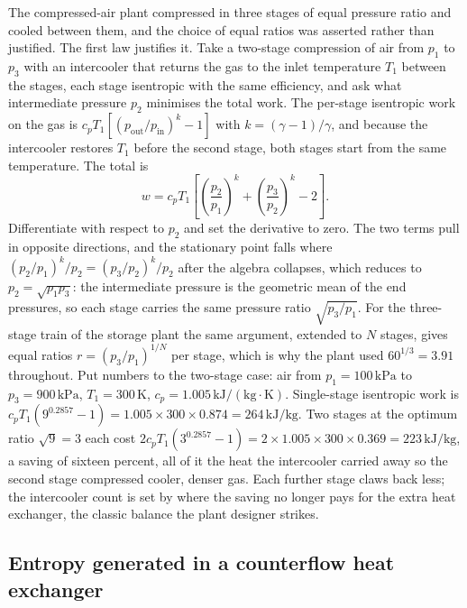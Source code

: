 The compressed-air plant compressed in three stages of equal pressure ratio and
cooled between them, and the choice of equal ratios was asserted rather than
justified. The first law justifies it. Take a two-stage compression of air from
$p_1$ to $p_3$ with an intercooler that returns the gas to the inlet temperature
$T_1$ between the stages, each stage isentropic with the same efficiency, and ask
what intermediate pressure $p_2$ minimises the total work. The per-stage
isentropic work on the gas is $c_p T_1[(p_{\text{out}}/p_{\text{in}})^{k} - 1]$
with $k = (\gamma-1)/\gamma$, and because the intercooler restores $T_1$ before
the second stage, both stages start from the same temperature. The total is
\[
w = c_p T_1\!\left[\left(\frac{p_2}{p_1}\right)^{k} +
\left(\frac{p_3}{p_2}\right)^{k} - 2\right].
\]
Differentiate with respect to $p_2$ and set the derivative to zero. The two
terms pull in opposite directions, and the stationary point falls where
$(p_2/p_1)^{k}/p_2 = (p_3/p_2)^{k}/p_2$ after the algebra collapses, which
reduces to $p_2 = \sqrt{p_1 p_3}$: the intermediate pressure is the geometric
mean of the end pressures, so each stage carries the same pressure ratio
$\sqrt{p_3/p_1}$. For the three-stage train of the storage plant the same
argument, extended to $N$ stages, gives equal ratios $r = (p_3/p_1)^{1/N}$ per
stage, which is why the plant used $60^{1/3} = 3.91$ throughout. Put numbers to
the two-stage case: air from $p_1 = 100\,\text{kPa}$ to $p_3 = 900\,\text{kPa}$,
$T_1 = 300\,\si{\kelvin}$, $c_p = 1.005\,\text{kJ}/(\text{kg}\cdot\si{\kelvin})$.
Single-stage isentropic work is $c_p T_1(9^{0.2857} - 1) = 1.005 \times 300
\times 0.874 = 264\,\text{kJ}/\text{kg}$. Two stages at the optimum ratio
$\sqrt{9} = 3$ each cost $2 c_p T_1(3^{0.2857} - 1) = 2 \times 1.005 \times 300
\times 0.369 = 223\,\text{kJ}/\text{kg}$, a saving of sixteen percent, all of it
the heat the intercooler carried away so the second stage compressed cooler,
denser gas. Each further stage claws back less; the intercooler count is set by
where the saving no longer pays for the extra heat exchanger, the classic balance
the plant designer strikes.

\subsection{Entropy generated in a counterflow heat exchanger}

